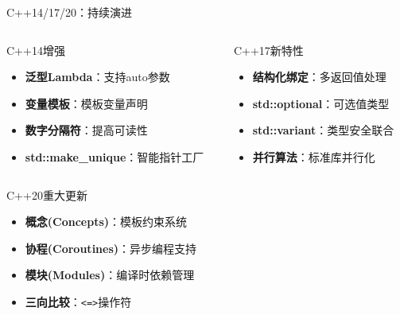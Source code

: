 \documentclass[UTF8,aspectratio=169]{beamer}
\begin{document}
\begin{frame}{C++14/17/20：持续演进}
    \begin{columns}
        \begin{column}{0.48\textwidth}
            \begin{ytublock}{C++14增强}
                \begin{itemize}
                    \item \textbf{泛型Lambda}：支持auto参数
                    \item \textbf{变量模板}：模板变量声明
                    \item \textbf{数字分隔符}：提高可读性
                    \item \textbf{std::make\_unique}：智能指针工厂
                \end{itemize}
            \end{ytublock}
        \end{column}
        \begin{column}{0.48\textwidth}
            \begin{ytublock}{C++17新特性}
                \begin{itemize}
                    \item \textbf{结构化绑定}：多返回值处理
                    \item \textbf{std::optional}：可选值类型
                    \item \textbf{std::variant}：类型安全联合
                    \item \textbf{并行算法}：标准库并行化
                \end{itemize}
            \end{ytublock}
        \end{column}
    \end{columns}

    \begin{ytublock}{C++20重大更新}
        \begin{itemize}
            \item \textbf{概念(Concepts)}：模板约束系统
            \item \textbf{协程(Coroutines)}：异步编程支持
            \item \textbf{模块(Modules)}：编译时依赖管理
            \item \textbf{三向比较}：\texttt{<=>}操作符
        \end{itemize}
    \end{ytublock}
\end{frame}
\end{document}

